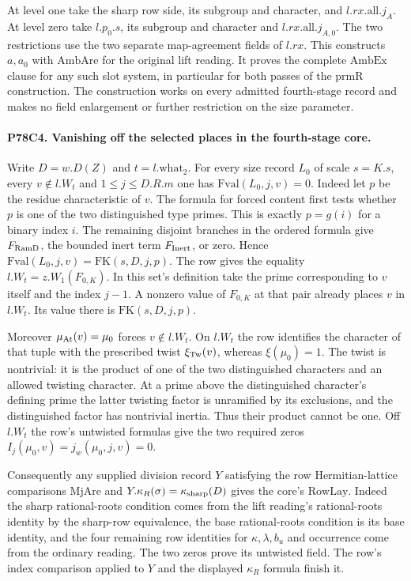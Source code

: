 At level one take the sharp row side, its subgroup and character,
and $l.rx.\mathrm{all}.j_A$. At level zero take $l.p_0.s$,
its subgroup and character and $l.rx.\mathrm{all}.j_{A,0}$.
The two restrictions use the two separate map-agreement fields
of $l.rx$. This constructs $a,a_0$ with $\mathrm{AmbAre}$ for the
original lift reading. It proves the complete $\mathrm{AmbEx}$
clause for any such slot system, in particular for both passes
of the $\mathrm{prmR}$ construction. The construction works on
every admitted fourth-stage record and makes no field enlargement
or further restriction on the size parameter.

\paragraph{P78C4. Vanishing off the selected places in the fourth-stage core.}
Write $D=w.D(Z)$ and $t=l.\mathrm{what}_2$. For every size record
$L_0$ of scale $s=K.s$, every $v\notin l.W_t$ and
$1\le j\le D.R.m$ one has $\mathrm{Fval}(L_0,j,v)=0$.
Indeed let $p$ be the residue characteristic of $v$. The formula
for forced content first tests whether $p$ is one of the two
distinguished type primes. This is exactly $p=g(i)$ for a binary
index $i$. The remaining disjoint branches in the ordered formula
give $F_{\rm RamD}$, the bounded inert term $F_{\rm Inert}$, or
zero. Hence $\mathrm{Fval}(L_0,j,v)=\mathrm{FK}(s,D,j,p)$.
The row gives the equality $l.W_t=z.W_1(F_{0,K})$. In this set's
definition take the prime corresponding to $v$ itself and the index
$j-1$. A nonzero value of $F_{0,K}$ at that pair already places $v$
in $l.W_t$. Its value there is $\mathrm{FK}(s,D,j,p)$.

Moreover $\mu_{\rm At}(v)=\mu_0$ forces $v\notin l.W_t$.
On $l.W_t$ the row identifies the character of that tuple with
the prescribed twist $\xi_{\rm Tw}(v)$, whereas $\xi(\mu_0)=1$.
The twist is nontrivial: it is the product of one of the two
distinguished characters and an allowed twisting character.
At a prime above the distinguished character's defining prime
the latter twisting factor is unramified by its exclusions, and
the distinguished factor has nontrivial inertia. Thus their product
cannot be one. Off $l.W_t$ the row's untwisted formulas give the
two required zeros $I_j(\mu_0,v)=j_w(\mu_0,j,v)=0$.

Consequently any supplied division record $Y$ satisfying the
row Hermitian-lattice comparisons $\mathrm{MjAre}$ and
$Y.\kappa_R(\sigma)=\kappa_{\rm sharp}(D)$ gives the core's
$\mathrm{RowLay}$. Indeed the sharp rational-roots condition
comes from the lift reading's rational-roots identity by the
sharp-row equivalence, the base rational-roots condition is its
base identity, and the four remaining row identities for
$\kappa,\lambda,b_u$ and occurrence come from the ordinary reading.
The two zeros prove its untwisted field. The row's index comparison
applied to $Y$ and the displayed $\kappa_R$ formula finish it.

